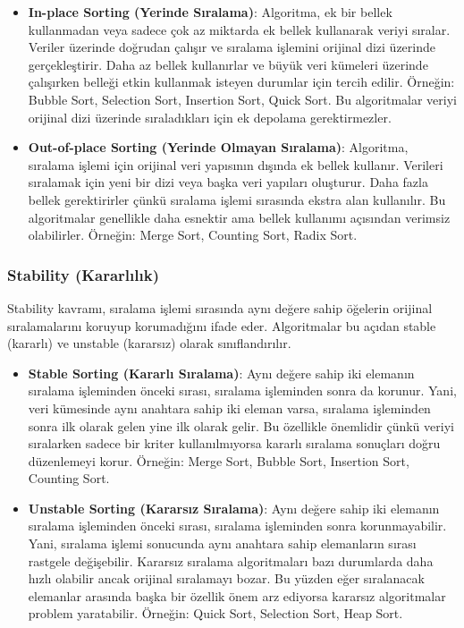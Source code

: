 \begin{itemize}
    \item \textbf{In-place Sorting (Yerinde Sıralama)}: Algoritma, ek bir bellek kullanmadan veya sadece çok az miktarda ek bellek kullanarak veriyi sıralar. Veriler üzerinde doğrudan çalışır ve sıralama işlemini orijinal dizi üzerinde gerçekleştirir. Daha az bellek kullanırlar ve büyük veri kümeleri üzerinde çalışırken belleği etkin kullanmak isteyen durumlar için tercih edilir. Örneğin: Bubble Sort, Selection Sort, Insertion Sort, Quick Sort. Bu algoritmalar veriyi orijinal dizi üzerinde sıraladıkları için ek depolama gerektirmezler.
    \item \textbf{Out-of-place Sorting (Yerinde Olmayan Sıralama)}: Algoritma, sıralama işlemi için orijinal veri yapısının dışında ek bellek kullanır. Verileri sıralamak için yeni bir dizi veya başka veri yapıları oluşturur. Daha fazla bellek gerektirirler çünkü sıralama işlemi sırasında ekstra alan kullanılır. Bu algoritmalar genellikle daha esnektir ama bellek kullanımı açısından verimsiz olabilirler. Örneğin: Merge Sort, Counting Sort, Radix Sort.
\end{itemize}

\subsubsection{Stability (Kararlılık)}

Stability kavramı, sıralama işlemi sırasında aynı değere sahip öğelerin orijinal sıralamalarını koruyup korumadığını ifade eder. Algoritmalar bu açıdan stable (kararlı) ve unstable (kararsız) olarak sınıflandırılır.

\begin{itemize}
    \item \textbf{Stable Sorting (Kararlı Sıralama)}: Aynı değere sahip iki elemanın sıralama işleminden önceki sırası, sıralama işleminden sonra da korunur. Yani, veri kümesinde aynı anahtara sahip iki eleman varsa, sıralama işleminden sonra ilk olarak gelen yine ilk olarak gelir. Bu özellikle önemlidir çünkü veriyi sıralarken sadece bir kriter kullanılmıyorsa  kararlı sıralama sonuçları doğru düzenlemeyi korur. Örneğin: Merge Sort, Bubble Sort, Insertion Sort, Counting Sort.
    \item \textbf{Unstable Sorting (Kararsız Sıralama)}: Aynı değere sahip iki elemanın sıralama işleminden önceki sırası, sıralama işleminden sonra korunmayabilir. Yani, sıralama işlemi sonucunda aynı anahtara sahip elemanların sırası rastgele değişebilir. Kararsız sıralama algoritmaları bazı durumlarda daha hızlı olabilir ancak orijinal sıralamayı bozar. Bu yüzden eğer sıralanacak elemanlar arasında başka bir özellik önem arz ediyorsa kararsız algoritmalar problem yaratabilir. Örneğin: Quick Sort, Selection Sort, Heap Sort.
\end{itemize}

